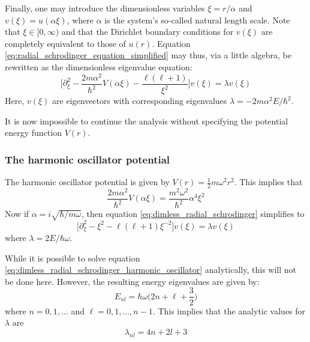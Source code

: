 \documentclass[reprint,english]{revtex4-1}
\begin{document}
Finally, one may introduce the dimensionless variables \(\xi=r/\alpha\) and \(v(\xi)=u(\alpha\xi)\), where \(\alpha\) is the system's so-called natural length scale. Note that \(\xi\in[0,\infty)\) and that the Dirichlet boundary conditions for \(v(\xi)\) are completely equivalent to those of \(u(r)\). Equation \eqref{eq:radial_schrodinger_equation_simplified} may thus, via a little algebra, be rewritten as the dimensionless eigenvalue equation:
\begin{equation}\label{eq:dimless_radial_schrodinger}
\Big[\partial_\xi^2-\frac{2m\alpha^2}{\hbar^2}V(\alpha\xi)-\frac{\ell(\ell+1)}{\xi^2}\Big]v(\xi)=\lambda v(\xi)
\end{equation}
Here, \(v(\xi)\) are eigenvectors with corresponding eigenvalues \(\lambda=-2m\alpha^2E/\hbar^2\).

It is now impossible to continue the analysis without specifying the potential energy function \(V(r)\).
\subsubsection{The harmonic oscillator potential}
The harmonic oscillator potential is given by \(V(r)=\frac{1}{2}m\omega^2r^2\). This implies that
\[\frac{2m\alpha^2}{\hbar^2}V(\alpha\xi)=\frac{m^2\omega^2}{\hbar^2}\alpha^4\xi^2\]
Now if \(\alpha=i\sqrt{\hbar/m\omega}\), then equation \eqref{eq:dimless_radial_schrodinger} simplifies to
\begin{equation}\label{eq:dimless_radial_schrodinger_harmonic_oscillator}
\Big[\partial_\xi^2-\xi^2-\ell(\ell+1)\xi^{-2}\Big]v(\xi)=\lambda v(\xi)
\end{equation}
where \(\lambda=2E/\hbar\omega\).

While it is possible to solve equation \eqref{eq:dimless_radial_schrodinger_harmonic_oscillator} analytically, this will not be done here. However, the resulting energy eigenvalues are given by:
\begin{equation}\label{eq:harmonic_oscillator_energies}
E_{nl}=\hbar\omega\bigg(2n+\ell+\frac{3}{2}\bigg)
\end{equation}
where \(n=0,1,\ldots\) and \(\ell=0,1,\ldots,n-1\). This implies that the analytic values for \(\lambda\) are
\begin{equation}\label{eq:harmonic_oscillator_dimless_eigenvalues}
\lambda_{nl}=4n+2l+3
\end{equation}
\end{document}
